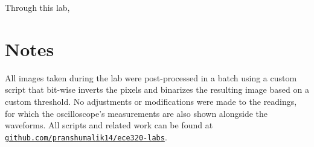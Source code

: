 \documentclass[10pt]{article}
\begin{document}
Through this lab, 

\section{Notes}

All images taken during the lab were post-processed in a batch using a custom script
that bit-wise inverts the pixels and binarizes the resulting image based on a custom threshold.
No adjustments or modifications were made to the readings, for which the oscilloscope's measurements
are also shown alongside the waveforms. All scripts and related work can be found at 
\href{https://github.com/pranshumalik14/ece320-labs}{\texttt{github.com/pranshumalik14/ece320-labs}}.
\end{document}
